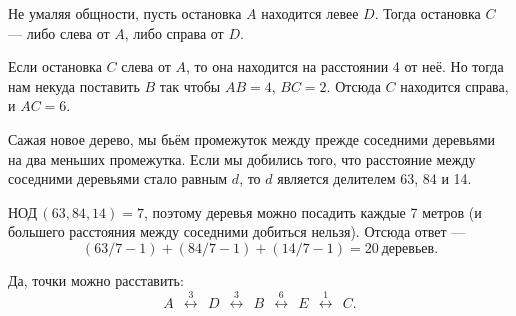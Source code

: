 \begin{itemize}

\itA Не умаляя общности, пусть остановка $A$ находится левее $D$. Тогда остановка $C$ — либо слева от $A$, либо справа от $D$.

Если остановка $C$ слева от $A$, то она находится на расстоянии 4 от неё. Но тогда нам некуда поставить $B$ так чтобы $AB=4$, $BC=2$. Отсюда $C$ находится справа, и $AC=6$.

\itB Сажая новое дерево, мы бьём промежуток между прежде соседними деревьями на два меньших промежутка. Если мы добились того, что расстояние между соседними деревьями стало равным $d$, то $d$ является делителем 63, 84 и 14.

$\text{НОД}\,(63,84,14)=7$, поэтому деревья можно посадить каждые 7 метров (и большего расстояния между соседними добиться нельзя). Отсюда ответ —
$$(63/7-1)+(84/7-1)+(14/7-1) = 20\ \text{деревьев}.$$

\def\disbetw#1{\ \ \stackrel{#1}{\longleftrightarrow}\ \ }

\itC Да, точки можно расставить:
$$A \disbetw 3 D \disbetw 3 B \disbetw 6 E \disbetw 1 C.$$
\end{itemize}
